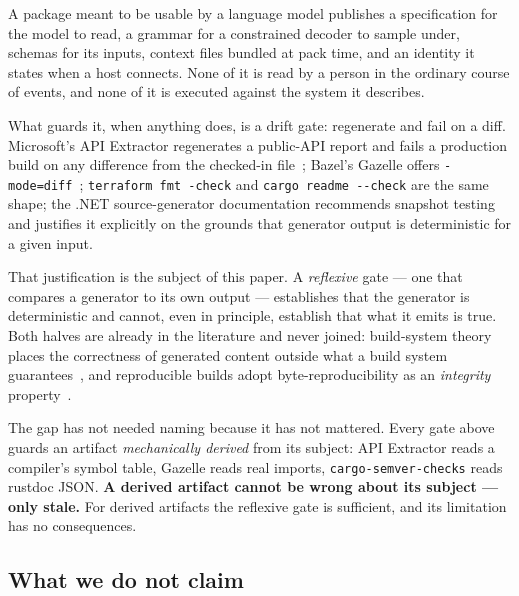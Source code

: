 \documentclass[10pt,conference]{IEEEtran}
\begin{document}
A package meant to be usable by a language model publishes a specification for the model
to read, a grammar for a constrained decoder to sample under, schemas for its inputs,
context files bundled at pack time, and an identity it states when a host connects. None
of it is read by a person in the ordinary course of events, and none of it is executed
against the system it describes.

What guards it, when anything does, is a drift gate: regenerate and fail on a diff.
Microsoft's API Extractor regenerates a public-API report and fails a production build on
any difference from the checked-in file~\cite{api_extractor}; Bazel's Gazelle offers
\texttt{-mode=diff}~\cite{bazel_gazelle}; \texttt{terraform fmt -check} and
\texttt{cargo readme -{}-check} are the same shape; the .NET source-generator
documentation recommends snapshot testing and justifies it explicitly on the grounds that
generator output is deterministic for a given input.

That justification is the subject of this paper. A \emph{reflexive} gate --- one that
compares a generator to its own output --- establishes that the generator is
deterministic and cannot, even in principle, establish that what it emits is true. Both
halves are already in the literature and never joined: build-system theory places the
correctness of generated content outside what a build system
guarantees~\cite{mokhov2020buildsystems}, and reproducible builds adopt
byte-reproducibility as an \emph{integrity} property~\cite{lamb2022reproducible}.

The gap has not needed naming because it has not mattered. Every gate above guards an
artifact \emph{mechanically derived} from its subject: API Extractor reads a compiler's
symbol table, Gazelle reads real imports, \texttt{cargo-semver-checks} reads rustdoc
JSON. \textbf{A derived artifact cannot be wrong about its subject --- only stale.} For
derived artifacts the reflexive gate is sufficient, and its limitation has no
consequences.

\subsection{What we do not claim}
\end{document}
